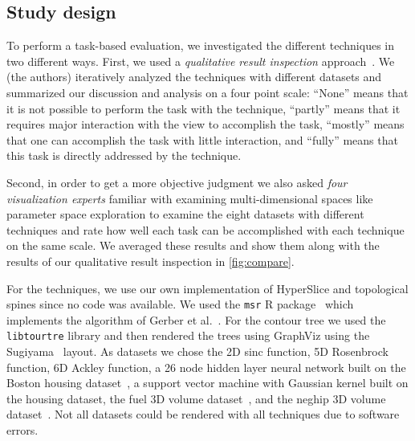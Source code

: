 
\subsection{Study design}

To perform a task-based evaluation, we investigated the different techniques in two different ways.
First, we used a \textit{qualitative result inspection}
approach~\cite{Isenberg:2013}. 
We (the authors) iteratively analyzed the techniques with different datasets and summarized
our discussion and analysis on a four point scale:
``None'' means that it is not possible to perform the task with the technique,
``partly'' means that it requires major interaction with the view to accomplish
the task, ``mostly'' means that one can accomplish the task with little
interaction, and ``fully'' means that this task is directly addressed by the
technique. 

Second, in order to get a more objective judgment we also asked 
\textit{four visualization experts} familiar with examining multi-dimensional spaces like
parameter space exploration to examine the eight datasets with different
techniques and rate how well each task can be accomplished with each technique
on the same scale. We averaged these results and show them along with the
results of our qualitative result inspection in \autoref{fig:compare}.

For the techniques, we use our own implementation of HyperSlice and topological
spines since no code was available. We used the \texttt{msr} R
package~\cite{Gerber:2012} which implements the algorithm of Gerber et
al.~\cite{Gerber:2010}. For the contour tree we used the \texttt{libtourtre}
library and then rendered the trees using GraphViz using the
Sugiyama~\cite{Gansner:1993} layout.  As datasets we chose the 2D sinc
function, 5D Rosenbrock~\cite{Rosenbrock:1960} function, 6D Ackley function, a
26 node hidden layer neural network built on the Boston housing
dataset~\cite{Lichman:2013}, a support vector machine with Gaussian kernel
built on the housing dataset, the fuel 3D volume dataset~\cite{Roettger:2017},
and the neghip 3D volume dataset~\cite{Roettger:2017}.  
Not all datasets could be rendered with all techniques due to software errors.

